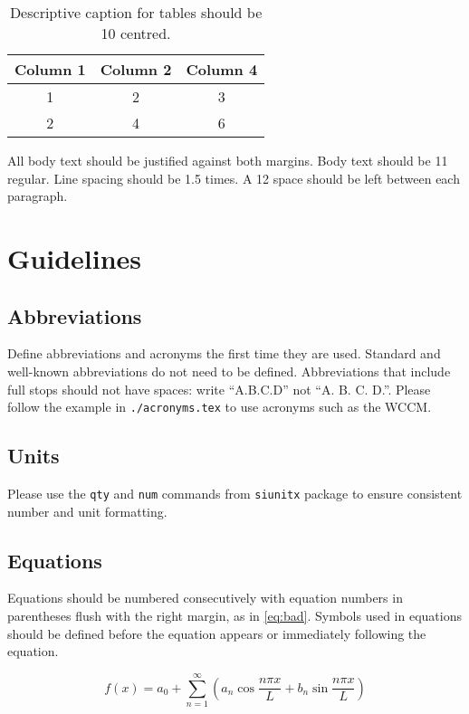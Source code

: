 \documentclass[a4paper,11pt]{article}
\begin{document}
\begin{table}[h]
  \centering
  \begin{tabular}{| c | c | c |}
    \hline
    Column 1 & Column 2 & Column 4 \\
    \hline
    1 & 2 & 3 \\
    \hline
    2 & 4 & 6 \\
    \hline
  \end{tabular}
  \caption{Descriptive caption for tables should be \qty{10}{\point} centred.
  }\label{tab:bad}
\end{table}

All body text should be justified against both margins. Body text should be
\qty{11}{\point} regular. Line spacing should be \num{1.5} times. A
\qty{12}{\point} space should be left between each paragraph. 

\section{Guidelines}

\subsection{Abbreviations}

Define abbreviations and acronyms the first time they are used. Standard and
well-known abbreviations do not need to be defined. Abbreviations that include
full stops should not have spaces: write ``A.B.C.D'' not ``A. B. C. D.''. 
Please follow the example in \texttt{./acronyms.tex} to use acronyms such as
the \ac{WCCM}.

\subsection{Units}

Please use the \texttt{qty} and \texttt{num} commands from \texttt{siunitx}
package to ensure consistent number and unit formatting. 

\subsection{Equations}

Equations should be numbered consecutively with equation numbers in parentheses
flush with the right margin, as in \eqref{eq:bad}. Symbols used in equations
should be defined before the equation appears or immediately following the
equation. 

\begin{equation}\label{eq:bad}
  f(x) = a_{0} + \sum_{n = 1}^{\infty} \left( a_{n} \cos \frac{n\pi x}{L} + b_{n} \sin \frac{n\pi x}{L}\right)
\end{equation}
\end{document}

